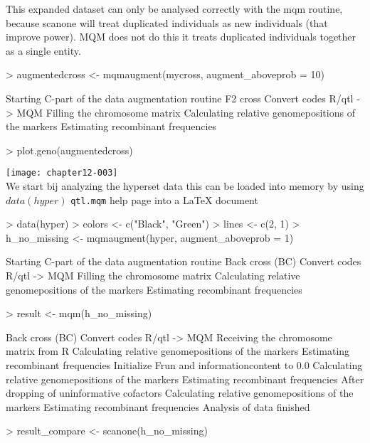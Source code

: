 \documentclass[a4paper]{article}
\begin{document}
This expanded dataset can only be analysed correctly with the mqm routine, because scanone will treat duplicated individuals
as new individuals (that improve power). MQM does not do this it treats duplicated individuals together as a single entity.
\\
\begin{Schunk}
\begin{Sinput}
> augmentedcross <- mqmaugment(mycross, augment_aboveprob = 10)
\end{Sinput}
\begin{Soutput}
Starting C-part of the data augmentation routine
F2 cross
Convert codes R/qtl -> MQM
Filling the chromosome matrix
Calculating relative genomepositions of the markers
Estimating recombinant frequencies
\end{Soutput}
\begin{Sinput}
> plot.geno(augmentedcross)
\end{Sinput}
\end{Schunk}
\texttt{[image: chapter12-003]}
\\
We start bij analyzing the hyperset data this can be loaded into memory by using $data(hyper)$
\texttt{qtl.mqm} help page into a \LaTeX{} document
\\
\begin{Schunk}
\begin{Sinput}
> data(hyper)
> colors <- c("Black", "Green")
> lines <- c(2, 1)
> h_no_missing <- mqmaugment(hyper, augment_aboveprob = 1)
\end{Sinput}
\begin{Soutput}
Starting C-part of the data augmentation routine
Back cross (BC)
Convert codes R/qtl -> MQM
Filling the chromosome matrix
Calculating relative genomepositions of the markers
Estimating recombinant frequencies
\end{Soutput}
\begin{Sinput}
> result <- mqm(h_no_missing)
\end{Sinput}
\begin{Soutput}
Back cross (BC)
Convert codes R/qtl -> MQM
Receiving the chromosome matrix from R
Calculating relative genomepositions of the markers
Estimating recombinant frequencies
Initialize Frun and informationcontent to 0.0
Calculating relative genomepositions of the markers
Estimating recombinant frequencies
After dropping of uninformative cofactors
Calculating relative genomepositions of the markers
Estimating recombinant frequencies
Analysis of data finished
\end{Soutput}
\begin{Sinput}
> result_compare <- scanone(h_no_missing)
\end{Sinput}
\end{Schunk}
\end{document}
